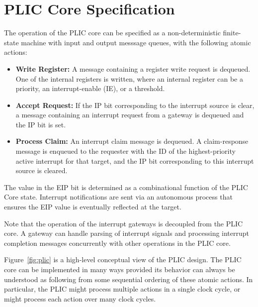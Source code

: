 \section{PLIC Core Specification}

The operation of the PLIC core can be specified as a non-deterministic
finite-state machine with input and output messsage queues, with the
following atomic actions:

\begin{itemize}

\item {\bf Write Register: } A message containing a register write
  request is dequeued.  One of the internal registers is written,
  where an internal register can be a priority, an interrupt-enable
  (IE), or a threshold.

\item {\bf Accept Request: } If the IP bit corresponding to the
  interrupt source is clear, a message containing an interrupt request
  from a gateway is dequeued and the IP bit is set.

\item {\bf Process Claim: } An interrupt claim message is dequeued.  A
  claim-response message is enqueued to the requester with the ID of
  the highest-priority active interrupt for that target, and the IP
  bit corresponding to this interrupt source is cleared.

\end{itemize}

The value in the EIP bit is determined as a combinational function of
the PLIC Core state.  Interrupt notifications are sent via an
autonomous process that ensures the EIP value is eventually reflected
at the target. 

Note that the operation of the interrupt gateways is decoupled from
the PLIC core.  A gateway can handle parsing of interrupt signals and
processing interrupt completion messages concurrently with other
operations in the PLIC core.

\begin{commentary}
Figure~\ref{fig:plic} is a high-level conceptual view of the PLIC
design.  The PLIC core can be implemented in many ways provided its
behavior can always be understood as following from some sequential
ordering of these atomic actions.  In particular, the PLIC might
process multiple actions in a single clock cycle, or might process
each action over many clock cycles.
\end{commentary}

